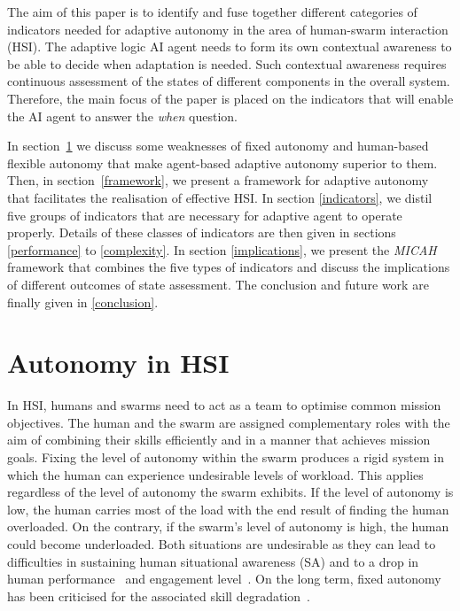 \documentclass[journal]{IEEEtran}
\begin{document}
The aim of this paper is to identify and fuse together different categories of indicators needed for adaptive autonomy in the area of human-swarm interaction (HSI). 
The adaptive logic AI agent needs to form its own contextual awareness to be able to decide when adaptation is needed.
Such contextual awareness requires continuous assessment of the states of different components in the overall system.
Therefore, the main focus of the paper is placed on the indicators that will enable the AI agent to answer the \textit{when} question. 

In section~\ref{Autonomy} we discuss some weaknesses of fixed autonomy and human-based flexible autonomy that make agent-based adaptive autonomy superior to them. 
Then, in section~\ref{framework}, we present a framework for adaptive autonomy that facilitates the realisation of effective HSI. 
In section \ref{indicators}, we distil five groups of indicators that are necessary for adaptive agent to operate properly. 
Details of these classes of indicators are then given in sections \ref{performance} to \ref{complexity}. 
In section \ref{implications}, we present the \textit{MICAH} framework that combines the five types of indicators and discuss the implications of different outcomes of state assessment. 
The conclusion and future work are finally given in \ref{conclusion}.

\section{Autonomy in HSI}\label{Autonomy}
In HSI, humans and swarms need to act as a team to optimise common mission objectives. 
The human and the swarm are assigned complementary roles with the aim of combining their skills efficiently and in a manner that achieves mission goals. 
Fixing the level of autonomy within the swarm produces a rigid system in which the human can experience undesirable levels of workload. 
This applies regardless of the level of autonomy the swarm exhibits. 
If the level of autonomy is low, the human carries most of the load with the end result of finding the human overloaded. 
On the contrary, if the swarm\textquoteright s level of autonomy is high, the human could become underloaded. 
Both situations are undesirable as they can lead to difficulties in sustaining human situational awareness (SA) and to a drop in human performance~\cite{endsley1997} and engagement level~\cite{endsley2017}. 
On the long term, fixed autonomy has been criticised for the associated skill degradation~\cite{aiding}.
\end{document}
